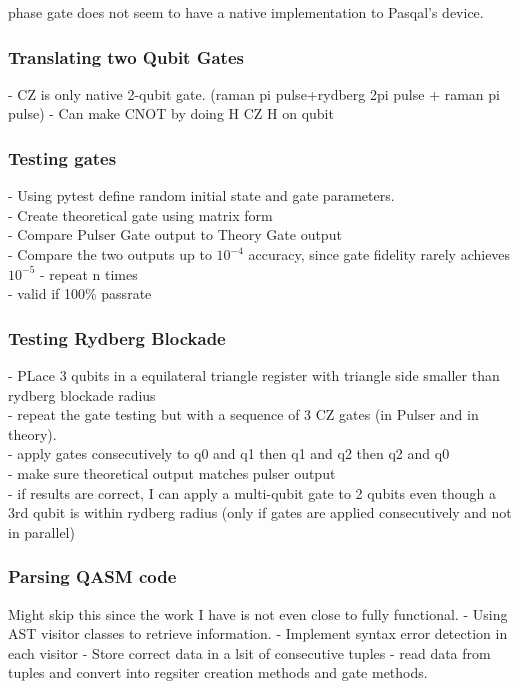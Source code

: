     phase gate does not seem to have a native implementation to Pasqal's device.

\subsubsection{Translating two Qubit Gates}
\label{sec:MultiGatesTranslating}
- CZ is only native 2-qubit gate. (raman pi pulse+rydberg 2pi pulse + raman pi pulse)
- Can make CNOT by doing H CZ H on qubit


\subsubsection{Testing gates}
\label{sec:MultiGatesTranslating}
- Using pytest define random initial state and gate parameters.\\
- Create theoretical gate using matrix form\\
- Compare Pulser Gate output to Theory Gate output \\
- Compare the two outputs up to $10^{-4}$ accuracy, since gate fidelity rarely achieves $10^{-5}$
- repeat n times\\
- valid if 100\% passrate


\subsubsection{Testing Rydberg Blockade}
- PLace 3 qubits in a equilateral triangle register with triangle side smaller than rydberg blockade radius\\
- repeat the gate testing but with a sequence of 3 CZ gates (in Pulser and in theory).\\
- apply gates consecutively to q0 and q1 then q1 and q2 then q2 and q0\\
- make sure theoretical output matches pulser output\\
- if results are correct, I can apply a multi-qubit gate to 2 qubits even though a 3rd qubit is within rydberg radius (only if gates are applied consecutively and not in parallel)\\


\subsubsection{Parsing QASM code}
Might skip this since the work I have is not even close to fully functional.
- Using AST visitor classes to retrieve information.
- Implement syntax error detection in each visitor
- Store correct data in a lsit of consecutive tuples
- read data from tuples and convert into regsiter creation methods and gate methods.